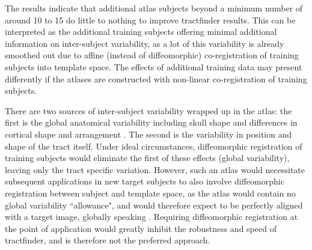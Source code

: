 The results indicate that additional atlas subjects beyond a minimum number of around 10 to 15 do little to nothing to improve tractfinder results.
This can be interpreted as the additional training subjects offering minimal additional information on inter-subject variability, as a lot of this variability is already smoothed out due to affine (instead of diffeomorphic) co-registration of training subjects into template space.
The effects of additional training data may present differently if the atlases are constructed with non-linear co-registration of training subjects.

There are two sources of inter-subject variability wrapped up in the atlas: the first is the global anatomical variability including skull shape and differences in cortical shape and arrangement .
The second is the variability in position and shape of the tract itself.
Under ideal circumstances, diffeomorphic registration of training subjects would eliminate the first of these effects (global variability), leaving only the tract specific variation.
However, such an atlas would necessitate subsequent applications in new target subjects to also involve diffeomorphic registration between subject and template space, as the atlas would contain no global variability ``allowance", and would therefore expect to be perfectly aligned with a target image, globally speaking .
Requiring diffeomorphic registration at the point of application would greatly inhibit the robustness and speed of tractfinder, and is therefore not the preferred approach.
